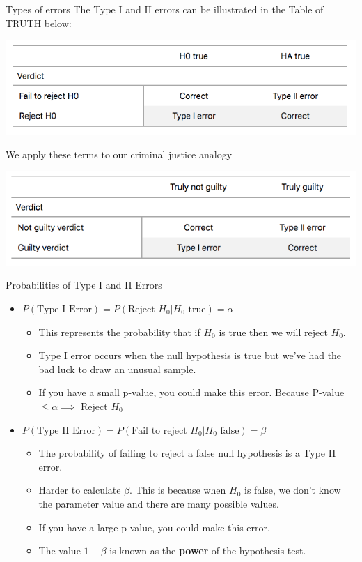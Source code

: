 \documentclass[
  ignorenonframetext,
]{beamer}
\providecommand{\tightlist}{%
  \setlength{\itemsep}{0pt}\setlength{\parskip}{0pt}}
\begin{document}
\begin{frame}{Types of errors}
\protect\hypertarget{types-of-errors-1}{}
The Type I and II errors can be illustrated in the Table of TRUTH below:

\begin{center}\includegraphics[width=0.6\linewidth,height=0.3\textheight]{week12_9a} \end{center}

We apply these terms to our criminal justice analogy

\begin{center}\includegraphics[width=0.6\linewidth,height=0.3\textheight]{week12_9b} \end{center}
\end{frame}

\begin{frame}{Probabilities of Type I and II Errors}
\protect\hypertarget{probabilities-of-type-i-and-ii-errors}{}
\begin{itemize}
\item
  \(P(\text{Type I Error})=P(\text{Reject } H_0 | H_0 \text{ true})=\alpha\)

  \begin{itemize}
  \tightlist
  \item
    This represents the probability that if \(H_0\) is true then we will
    reject \(H_0\).
  \item
    Type I error occurs when the null hypothesis is true but we've had
    the bad luck to draw an unusual sample.
  \item
    If you have a small p-value, you could make this error. Because
    P-value \(\leq \alpha \implies\) Reject \(H_0\)
  \end{itemize}
\item
  \(P(\text{Type II Error})=P(\text{Fail to reject } H_0 | H_0 \text{ false})=\beta\)

  \begin{itemize}
  \tightlist
  \item
    The probability of failing to reject a false null hypothesis is a
    Type II error.
  \item
    Harder to calculate \(\beta\). This is because when \(H_0\) is
    false, we don't know the parameter value and there are many possible
    values.
  \item
    If you have a large p-value, you could make this error.
  \item
    The value \(1-\beta\) is known as the \textbf{power} of the
    hypothesis test.
  \end{itemize}
\end{itemize}
\end{frame}
\end{document}
